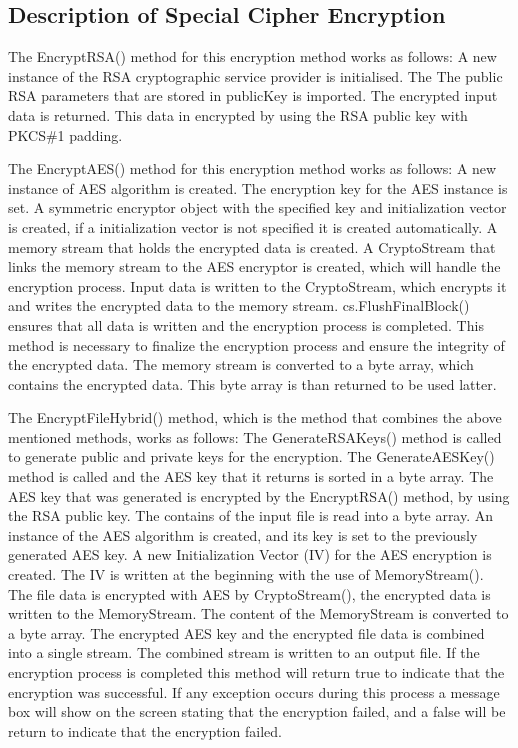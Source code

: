 \documentclass[a4paper,oneside,11pt]{book}
\begin{document}
\subsection{Description of Special Cipher Encryption}

The EncryptRSA() method for this encryption method works as follows:
A new instance of the RSA cryptographic service provider is initialised. The The public RSA parameters that are stored in publicKey is imported. The encrypted input data is returned. This data in encrypted by using the RSA public key with PKCS\#1 padding.

The EncryptAES() method for this encryption method works as follows:
A new instance of AES algorithm is created. The encryption key for the AES instance is set. A symmetric encryptor object with the specified key and initialization vector is created, if a initialization vector is not specified it is created automatically. A memory stream that holds the encrypted data is created. A CryptoStream that links the memory stream to the AES encryptor is created, which will handle the encryption process. Input data is written to the CryptoStream, which encrypts it and writes the encrypted data to the memory stream. cs.FlushFinalBlock() ensures that all data is written and the encryption process is completed. This method is necessary to finalize the encryption process and ensure the integrity of the encrypted data. The memory stream is converted to a byte array, which contains the encrypted data. This byte array is than returned to be used latter.

The EncryptFileHybrid() method, which is the method that combines the above mentioned methods, works as follows:
The GenerateRSAKeys() method is called to generate public and private keys for the encryption. The GenerateAESKey() method is called and the AES key that it returns is sorted in a byte array. The AES key that was generated is encrypted by the EncryptRSA() method, by using the RSA public key. The contains of the input file is read into a byte array. An instance of the AES algorithm is created, and its key is set to the previously generated AES key. A new Initialization Vector (IV) for the AES encryption is created. The IV is written at the beginning with the use of MemoryStream(). The file data is encrypted with AES by CryptoStream(), the encrypted data is written to the MemoryStream. The content of the MemoryStream is converted to a byte array. The encrypted AES key and the encrypted file data is combined into a single stream. The combined stream is written to an output file. If the encryption process is completed this method will return true to indicate that the encryption was successful. If any exception occurs during this process a message box will show on the screen stating that the encryption failed, and a false will be return to indicate that the encryption failed.
\end{document}
